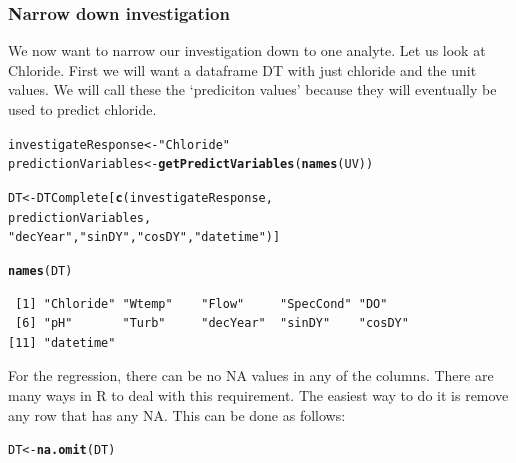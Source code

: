 \documentclass[a4paper,11pt]{article}\usepackage[]{graphicx}\usepackage[]{color}
\makeatletter
\newcommand{\hlstr}[1]{\textcolor[rgb]{0.192,0.494,0.8}{#1}}%
\newcommand{\hlstd}[1]{\textcolor[rgb]{0.345,0.345,0.345}{#1}}%
\newcommand{\hlkwb}[1]{\textcolor[rgb]{0.69,0.353,0.396}{#1}}%
\newcommand{\hlkwd}[1]{\textcolor[rgb]{0.737,0.353,0.396}{\textbf{#1}}}%
\newenvironment{kframe}{%
 \def\at@end@of@kframe{}%
 \ifinner\ifhmode%
  \def\at@end@of@kframe{\end{minipage}}%
  \begin{minipage}{\columnwidth}%
 \fi\fi%
 \def\FrameCommand##1{\hskip\@totalleftmargin \hskip-\fboxsep
 \colorbox{shadecolor}{##1}\hskip-\fboxsep
     \hskip-\linewidth \hskip-\@totalleftmargin \hskip\columnwidth}%
 \MakeFramed {\advance\hsize-\width
   \@totalleftmargin\z@ \linewidth\hsize
   \@setminipage}}%
 {\par\unskip\endMakeFramed%
 \at@end@of@kframe}
\newenvironment{knitrout}{}{} %
\makeatother
\begin{document}
\subsubsection{Narrow down investigation}


We now want to narrow our investigation down to one analyte. Let us look at Chloride. First we will want a dataframe DT with just chloride and the unit values. We will call these the `prediciton values' because they will eventually be used to predict chloride.

\begin{knitrout}
\color{fgcolor}\begin{kframe}
\begin{alltt}
\hlstd{investigateResponse} \hlkwb{<-} \hlstr{"Chloride"}
\hlstd{predictionVariables} \hlkwb{<-} \hlkwd{getPredictVariables}\hlstd{(}\hlkwd{names}\hlstd{(UV))}

\hlstd{DT} \hlkwb{<-} \hlstd{DTComplete[}\hlkwd{c}\hlstd{(investigateResponse,}
                   \hlstd{predictionVariables,}
                   \hlstr{"decYear"}\hlstd{,}\hlstr{"sinDY"}\hlstd{,}\hlstr{"cosDY"}\hlstd{,}\hlstr{"datetime"}\hlstd{)]}

\hlkwd{names}\hlstd{(DT)}
\end{alltt}
\begin{verbatim}
 [1] "Chloride" "Wtemp"    "Flow"     "SpecCond" "DO"      
 [6] "pH"       "Turb"     "decYear"  "sinDY"    "cosDY"   
[11] "datetime"
\end{verbatim}
\end{kframe}
\end{knitrout}


For the regression, there can be no NA values in any of the columns. There are many ways in R to deal with this requirement. The easiest way to do it is remove any row that has any NA. This can be done as follows:

\begin{knitrout}
\color{fgcolor}\begin{kframe}
\begin{alltt}
\hlstd{DT} \hlkwb{<-} \hlkwd{na.omit}\hlstd{(DT)}
\end{alltt}
\end{kframe}
\end{knitrout}
\end{document}
